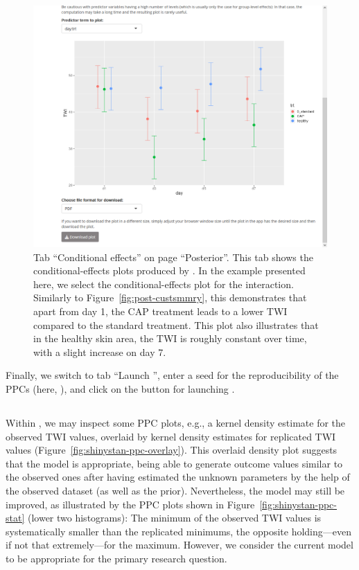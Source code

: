 \begin{figure}[t!]
  \centering
  \includegraphics[width=\textwidth]{Figures/Posterior_CondEff.png}
  \caption[Tab ``Conditional effects'']{Tab ``Conditional effects'' on page ``Posterior''.
  This tab shows the conditional-effects plots produced by .
  In the example presented here, we select the conditional-effects plot for the
   interaction. Similarly to Figure~\ref{fig:post-custsmmry}, this demonstrates
  that apart from day 1, the CAP treatment leads to a lower TWI compared to the standard
  treatment. This plot also illustrates that in the healthy skin area, the TWI is roughly
  constant over time, with a slight increase on day 7.}
  \label{fig:post-ceff}
\end{figure}%

Finally, we switch to tab ``Launch '', enter a seed for
the reproducibility of the PPCs (here, ), and click on the button
for launching .

\subsection[shinystan]{}
\label{exmpl-shinystan}

Within , we may inspect some PPC plots, e.g., a kernel density
estimate for the observed TWI values, overlaid by kernel density estimates for
replicated TWI values (Figure~\ref{fig:shinystan-ppc-overlay}). This overlaid
density plot suggests that the model is appropriate, being able to generate
outcome values similar to the observed ones after having estimated the unknown
parameters by the help of the observed dataset (as well as the prior).
Nevertheless, the model may still be improved, as illustrated by
the PPC plots shown in Figure~\ref{fig:shinystan-ppc-stat} (lower two
histograms): The minimum of the observed TWI values is systematically smaller
than the replicated minimums, the opposite holding---even if not that
extremely---for the maximum. However, we consider the current model to be
appropriate for the primary research question.


